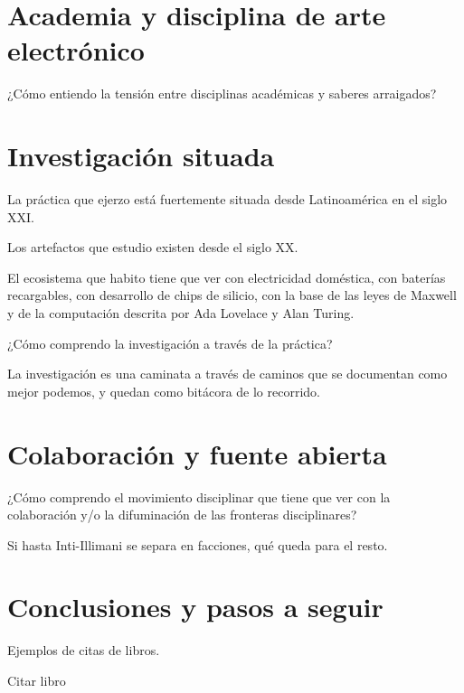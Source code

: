 \documentclass{article}
\begin{document}
\section{Academia y disciplina de arte electrónico}

¿Cómo entiendo la tensión entre disciplinas académicas y saberes arraigados?

\section{Investigación situada}

La práctica que ejerzo está fuertemente situada desde Latinoamérica en el siglo XXI.

Los artefactos que estudio existen desde el siglo XX.

El ecosistema que habito tiene que ver con electricidad doméstica, con baterías recargables, con desarrollo de chips de silicio, con la base de las leyes de Maxwell y de la computación descrita por Ada Lovelace y Alan Turing.

¿Cómo comprendo la investigación a través de la práctica?

La investigación es una caminata a través de caminos que se documentan como mejor podemos, y quedan como bitácora de lo recorrido.



\section{Colaboración y fuente abierta}

¿Cómo comprendo el movimiento disciplinar que tiene que ver con la colaboración y/o la difuminación de las fronteras disciplinares?

Si hasta Inti-Illimani se separa en facciones, qué queda para el resto.

\section{Conclusiones y pasos a seguir}

Ejemplos de citas de libros.

Citar libro \cite{korgBerlin}


\printbibliography[title={Bibliografía}, heading=bibintoc]
\end{document}
